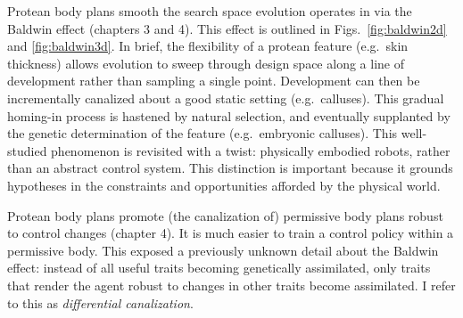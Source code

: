 Protean body plans smooth the search space evolution operates in via the Baldwin effect (chapters 3 and 4).
This effect is outlined in Figs.~\ref{fig:baldwin2d} and \ref{fig:baldwin3d}.
In brief, the flexibility of a protean feature
(e.g.~skin thickness) allows evolution to sweep through design space along a line of development rather than sampling a single point.
Development can then be incrementally canalized about a good static setting (e.g.~calluses).
This gradual homing-in process is hastened by natural selection,
and eventually supplanted by the genetic determination of the feature 
(e.g.~embryonic calluses).
This well-studied phenomenon is revisited with a twist:
physically embodied robots, rather than an abstract control system.
This distinction is important because it grounds hypotheses in the constraints and opportunities afforded by the physical world.


Protean body plans promote (the canalization of) permissive body plans robust to control changes (chapter 4).
It is much easier to train a control policy within a permissive body. 
This exposed a previously unknown detail about the Baldwin effect: instead of all useful traits becoming genetically assimilated, only traits that render the agent robust to changes in other traits become assimilated. 
I refer to this as \textit{differential canalization}.


